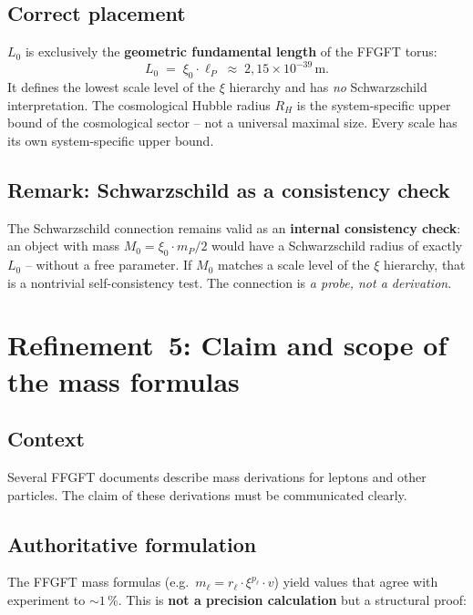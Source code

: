 \subsection*{Correct placement}

$L_0$ is exclusively the \textbf{geometric fundamental length} of the FFGFT
torus:
\begin{equation}
  L_0 \;=\; \xi_0 \cdot \ell_P \;\approx\; 2{,}15 \times 10^{-39}\,\text{m}.
  \tag{190.10}
\end{equation}
It defines the lowest scale level of the $\xi$ hierarchy and has \emph{no}
Schwarzschild interpretation. The cosmological Hubble radius $R_H$ is the
system-specific upper bound of the cosmological sector -- not a universal
maximal size. Every scale has its own system-specific upper bound.

\subsection*{Remark: Schwarzschild as a consistency check}

The Schwarzschild connection remains valid as an \textbf{internal consistency
check}: an object with mass $M_0 = \xi_0 \cdot m_P / 2$ would have a
Schwarzschild radius of exactly $L_0$ -- without a free parameter. If $M_0$
matches a scale level of the $\xi$ hierarchy, that is a nontrivial
self-consistency test. The connection is \emph{a probe, not a derivation}.

\section{Refinement~5: Claim and scope of the mass formulas}

\subsection*{Context}

Several FFGFT documents describe mass derivations for leptons and other
particles. The claim of these derivations must be communicated clearly.

\subsection*{Authoritative formulation}

The FFGFT mass formulas (e.g.\ $m_\ell = r_\ell \cdot \xi^{p_\ell} \cdot v$)
yield values that agree with experiment to $\sim 1\,\%$. This is \textbf{not a
precision calculation} but a structural proof:

